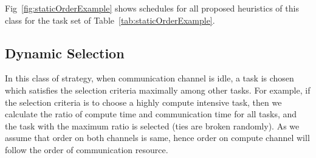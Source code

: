 \documentclass[sigconf]{acmart}
\begin{document}
	Fig~\ref{fig:staticOrderExample} shows schedules for all proposed heuristics of this class for the task set of Table~\ref{tab:staticOrderExample}.
	\subsection{Dynamic Selection}
	
	In this class of strategy, when communication channel is idle, a task is chosen which satisfies the selection criteria maximally among other tasks. For example, if the selection criteria is to choose a highly compute intensive task, then we calculate the ratio of compute time and communication time for all tasks, and the task with the maximum ratio is selected (ties are broken randomly). As we assume that order on both channels is same, hence order on compute channel will follow the order of communication resource.
	
\end{document}
